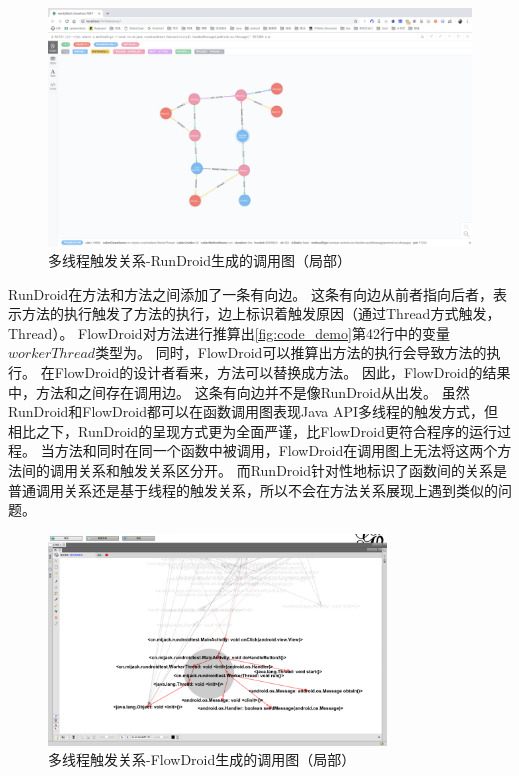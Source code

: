 \begin{figure}[ht]
	\centering
	\includegraphics[width=\textwidth]{./Figures/android-handler-rundroid.png}
	\caption{多线程触发关系-RunDroid生成的调用图（局部）}
	\label{fig:rundroid-result-handler}
\end{figure}







RunDroid在方法和方法之间添加了一条有向边。
这条有向边从前者指向后者，表示方法的执行触发了方法的执行，边上标识着触发原因（通过Thread方式触发，Thread）。
FlowDroid对方法进行推算出\autoref{fig:code_demo}第42行中的变量$workerThread$类型为。
同时，FlowDroid可以推算出方法的执行会导致方法的执行。
在FlowDroid的设计者看来，方法可以替换成方法。
因此，FlowDroid的结果中，方法和之间存在调用边。
这条有向边并不是像RunDroid从出发。
虽然RunDroid和FlowDroid都可以在函数调用图表现Java API多线程的触发方式，但相比之下，RunDroid的呈现方式更为全面严谨，比FlowDroid更符合程序的运行过程。
当方法和同时在同一个函数中被调用，FlowDroid在调用图上无法将这两个方法间的调用关系和触发关系区分开。
而RunDroid针对性地标识了函数间的关系是普通调用关系还是基于线程的触发关系，所以不会在方法关系展现上遇到类似的问题。

\begin{figure}[ht]
	\centering
	\includegraphics[width=0.8\textwidth]{./Figures/FlowDroid-handler.png}
	\caption{多线程触发关系-FlowDroid生成的调用图（局部）}
	\label{fig:flowdroid-result-handler}
\end{figure}

